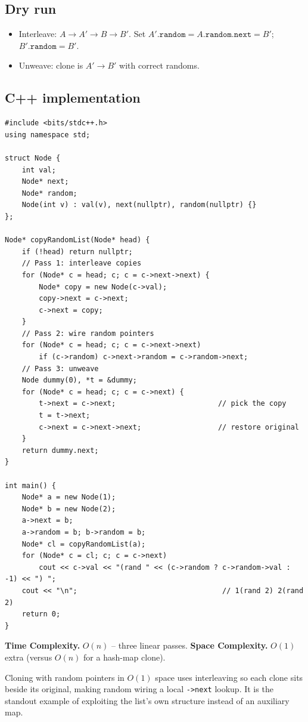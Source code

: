 \subsection*{Dry run}


\begin{itemize}
  \item Interleave: $A\to A'\to B\to B'$. Set $A'.\texttt{random}=
        A.\texttt{random}.\texttt{next}=B'$; $B'.\texttt{random}=B'$.
  \item Unweave: clone is $A'\to B'$ with correct randoms.
\end{itemize}

\subsection*{C++ implementation}

\begin{lstlisting}
#include <bits/stdc++.h>
using namespace std;

struct Node {
    int val;
    Node* next;
    Node* random;
    Node(int v) : val(v), next(nullptr), random(nullptr) {}
};

Node* copyRandomList(Node* head) {
    if (!head) return nullptr;
    // Pass 1: interleave copies
    for (Node* c = head; c; c = c->next->next) {
        Node* copy = new Node(c->val);
        copy->next = c->next;
        c->next = copy;
    }
    // Pass 2: wire random pointers
    for (Node* c = head; c; c = c->next->next)
        if (c->random) c->next->random = c->random->next;
    // Pass 3: unweave
    Node dummy(0), *t = &dummy;
    for (Node* c = head; c; c = c->next) {
        t->next = c->next;                        // pick the copy
        t = t->next;
        c->next = c->next->next;                  // restore original
    }
    return dummy.next;
}

int main() {
    Node* a = new Node(1);
    Node* b = new Node(2);
    a->next = b;
    a->random = b; b->random = b;
    Node* cl = copyRandomList(a);
    for (Node* c = cl; c; c = c->next)
        cout << c->val << "(rand " << (c->random ? c->random->val : -1) << ") ";
    cout << "\n";                                  // 1(rand 2) 2(rand 2)
    return 0;
}
\end{lstlisting}

\begin{complexitybox}
\textbf{Time Complexity.} $O(n)$ -- three linear passes. \textbf{Space
Complexity.} $O(1)$ extra (versus $O(n)$ for a hash-map clone).
\end{complexitybox}

\begin{takeawaybox}
Cloning with random pointers in $O(1)$ space uses interleaving so each
clone sits beside its original, making random wiring a local
\texttt{->next} lookup. It is the standout example of exploiting the list's
own structure instead of an auxiliary map.
\end{takeawaybox}
